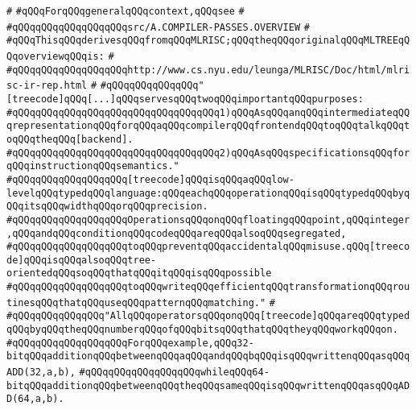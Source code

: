 \verb|#|\newline
\verb|#qQQqForqQQqgeneralqQQqcontext,qQQqsee|\newline
\verb|#|\newline
\verb|#qQQqqQQqqQQqqQQqqQQqsrc/A.COMPILER-PASSES.OVERVIEW|\newline
\verb|#|\newline
\verb|#qQQqThisqQQqderivesqQQqfromqQQqMLRISC;qQQqtheqQQqoriginalqQQqMLTREEqQQqoverviewqQQqis:|\newline
\verb|#|\newline
\verb|#qQQqqQQqqQQqqQQqqQQqhttp://www.cs.nyu.edu/leunga/MLRISC/Doc/html/mlrisc-ir-rep.html|\newline
\verb|#|\newline
\verb|#qQQqqQQqqQQqqQQq"[treecode]qQQq[...]qQQqservesqQQqtwoqQQqimportantqQQqpurposes:|\newline
\verb|#qQQqqQQqqQQqqQQqqQQqqQQqqQQqqQQqqQQq1)qQQqAsqQQqanqQQqintermediateqQQqrepresentationqQQqforqQQqaqQQqcompilerqQQqfrontendqQQqtoqQQqtalkqQQqtoqQQqtheqQQq[backend].|\newline
\verb|#qQQqqQQqqQQqqQQqqQQqqQQqqQQqqQQqqQQq2)qQQqAsqQQqspecificationsqQQqforqQQqinstructionqQQqsemantics."|\newline
\verb|#qQQqqQQqqQQqqQQqqQQq[treecode]qQQqisqQQqaqQQqlow-levelqQQqtypedqQQqlanguage:qQQqeachqQQqoperationqQQqisqQQqtypedqQQqbyqQQqitsqQQqwidthqQQqorqQQqprecision.|\newline
\verb|#qQQqqQQqqQQqqQQqqQQqOperationsqQQqonqQQqfloatingqQQqpoint,qQQqinteger,qQQqandqQQqconditionqQQqcodeqQQqareqQQqalsoqQQqsegregated,|\newline
\verb|#qQQqqQQqqQQqqQQqqQQqtoqQQqpreventqQQqaccidentalqQQqmisuse.qQQq[treecode]qQQqisqQQqalsoqQQqtree-orientedqQQqsoqQQqthatqQQqitqQQqisqQQqpossible|\newline
\verb|#qQQqqQQqqQQqqQQqqQQqtoqQQqwriteqQQqefficientqQQqtransformationqQQqroutinesqQQqthatqQQquseqQQqpatternqQQqmatching."|\newline
\verb|#|\newline
\verb|#qQQqqQQqqQQqqQQq"AllqQQqoperatorsqQQqonqQQq[treecode]qQQqareqQQqtypedqQQqbyqQQqtheqQQqnumberqQQqofqQQqbitsqQQqthatqQQqtheyqQQqworkqQQqon.|\newline
\verb|#qQQqqQQqqQQqqQQqqQQqForqQQqexample,qQQq32-bitqQQqadditionqQQqbetweenqQQqaqQQqandqQQqbqQQqisqQQqwrittenqQQqasqQQqADD(32,a,b),|\newline
\verb|#qQQqqQQqqQQqqQQqqQQqwhileqQQq64-bitqQQqadditionqQQqbetweenqQQqtheqQQqsameqQQqisqQQqwrittenqQQqasqQQqADD(64,a,b).|\newline
